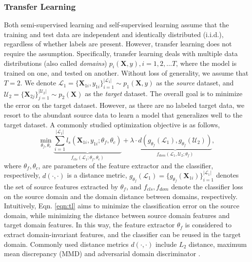 \documentclass[11pt]{article}
\begin{document}
\subsubsection{Transfer Learning}\label{sec:prelim-unsup-trans}
Both semi-supervised learning and self-supervised learning assume that the training and test data are independent and identically distributed (i.i.d.), regardless of whether labels are present. However, transfer learning \cite{Yilun-pan2010survey} does not require the assumption. Specifically, transfer learning deals with multiple data distributions (also called \textit{domains}) $p_i(\mathbf{X}, y), i=1, 2, \dots T$, where the model is trained on one, and tested on another. Without loss of generality, we assume that $T=2$. We denote $\mathcal{L}_1=\{\mathbf{X}_{1i}, y_{1i}\}_{i=1}^{|\mathcal{L}_1|}\sim p_1(\mathbf{X}, y)$ as the \textit{source} dataset, and $\mathcal{U}_2=\{\mathbf{X}_{2j}\}_{j=1}^{|\mathcal{U}_2|}\sim p_2(\mathbf{X})$ as the \textit{target} dataset. The overall goal is to minimize the error on the target dataset. However, as there are no labeled target data, we resort to the abundant source data to learn a model that generalizes well to the target dataset. A commonly studied optimization objective is as follows,
\begin{equation}
    \min_{\theta_{f}, \theta_c}  \underbrace{\sum_{i=1}^{|\mathcal{L}_1|}l_s(\mathbf{X}_{1i}, y_{1i}; \theta_f, \theta_c)}_{f_{cls}(\mathcal{L}_1;\theta_f, \theta_c)} + \lambda\cdot \underbrace{d\left(g_{\theta_f}\left(\mathcal{L}_1\right), g_{\theta_f}\left(\mathcal{U}_2\right)\right)}_{f_{dom}({\mathcal{L}_1, \mathcal{U}_2};\theta_f)},
    \label{eqn:tl}
\end{equation}
where $\theta_f, \theta_c$, are parameters of the feature extractor and the classifier, respectively, $d(\cdot, \cdot)$ is a distance metric, $g_{\theta_f}(\mathcal{L}_1) = \{g_{\theta_f}(\mathbf{X}_{1i})\}_{i=1}^{|\mathcal{L}_1|}$ denotes the set of source features extracted by $\theta_f$, and $f_{cls}, f_{dom}$ denote the classifier loss on the source domain and the domain distance between domains, respectively. Intuitively, Eqn. \ref{eqn:tl} aims to minimize the classification error on the source domain, while minimizing the distance between source domain features and target domain features. In this way, the feature extractor $\theta_f$ is considered to extract domain-invariant features, and the classifier can be reused in the target domain. Commonly used distance metrics $d(\cdot, \cdot)$ include $L_2$ distance, maximum mean discrepancy (MMD) \cite{Yilun-long2015learning} and adversarial domain discriminator \cite{Yilun-ganin2016domain}.
\end{document}
